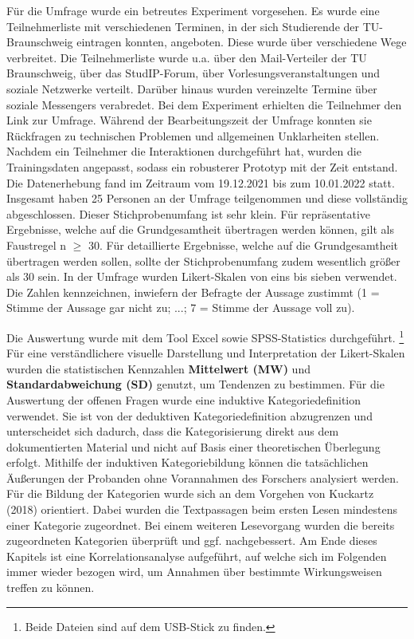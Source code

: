 Für die Umfrage wurde ein betreutes Experiment vorgesehen. Es wurde eine Teilnehmerliste
mit verschiedenen Terminen, in der sich 
Studierende der TU-Braunschweig eintragen konnten, angeboten. Diese wurde über verschiedene Wege verbreitet. 
Die Teilnehmerliste wurde u.a. über den Mail-Verteiler der TU Braunschweig, über das StudIP-Forum, über Vorlesungsveranstaltungen und 
soziale Netzwerke verteilt. Darüber hinaus wurden vereinzelte Termine über soziale 
Messengers verabredet. Bei dem Experiment erhielten die Teilnehmer den Link zur Umfrage. 
Während der Bearbeitungszeit der Umfrage konnten sie Rückfragen zu technischen Problemen
und allgemeinen Unklarheiten stellen. Nachdem ein Teilnehmer die Interaktionen durchgeführt hat, wurden die 
Trainingsdaten angepasst, sodass ein robusterer Prototyp mit der Zeit entstand. \\
Die Datenerhebung fand im Zeitraum vom 19.12.2021 bis zum 10.01.2022 statt. Insgesamt haben 25 Personen an der Umfrage teilgenommen und diese
vollständig abgeschlossen. Dieser Stichprobenumfang ist sehr klein. Für repräsentative Ergebnisse, 
welche auf die Grundgesamtheit übertragen werden können, gilt als Faustregel n $\geq$ 30.
Für detaillierte Ergebnisse, welche auf die Grundgesamtheit übertragen werden sollen, sollte der 
Stichprobenumfang zudem wesentlich größer als 30 sein. \parencite[71]{schöneck.2015} 
In der Umfrage wurden Likert-Skalen von eins bis sieben verwendet. 
Die Zahlen kennzeichnen, inwiefern der Befragte der Aussage zustimmt
(1 = Stimme der Aussage gar nicht zu; ...; 7 = Stimme der Aussage voll zu).

Die Auswertung wurde mit dem Tool \glqq Excel\grqq{} sowie \glqq SPSS-Statistics\grqq{} durchgeführt. \footnote{Beide Dateien sind auf dem USB-Stick zu finden.}
Für eine verständlichere visuelle Darstellung und Interpretation der Likert-Skalen wurden die
statistischen Kennzahlen \textbf{Mittelwert (MW)} und \textbf{Standardabweichung (SD)} genutzt,
um Tendenzen zu bestimmen. Für die Auswertung der offenen Fragen wurde eine 
induktive Kategoriedefinition verwendet. Sie ist von der deduktiven Kategoriedefinition 
abzugrenzen und unterscheidet sich dadurch, dass die Kategorisierung direkt aus dem
dokumentierten Material und nicht auf Basis einer theoretischen Überlegung erfolgt. Mithilfe
der induktiven Kategoriebildung können 
die tatsächlichen Äußerungen der Probanden ohne Vorannahmen des Forschers analysiert werden. \parencite[85 f.]{Mayring.2015}
Für die Bildung der Kategorien wurde sich an dem Vorgehen von Kuckartz (2018) orientiert. 
Dabei wurden die Textpassagen beim ersten Lesen mindestens einer Kategorie zugeordnet. Bei einem weiteren Lesevorgang 
wurden die bereits zugeordneten Kategorien überprüft und ggf. nachgebessert. \parencite[102 ff.]{Kuckartz.2018}
Am Ende dieses Kapitels ist eine Korrelationsanalyse aufgeführt, auf welche sich im Folgenden immer 
wieder bezogen wird, um Annahmen über bestimmte Wirkungsweisen treffen zu können.

